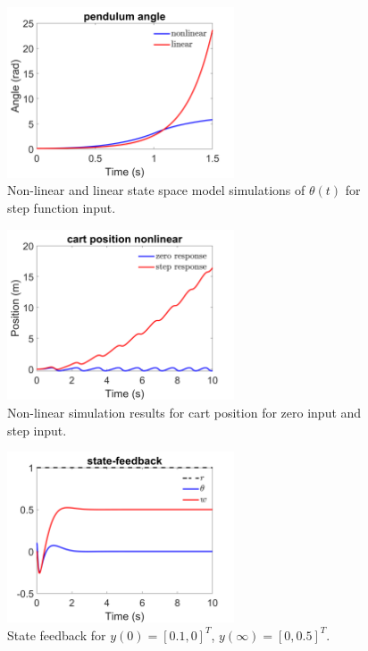 \documentclass[12pt]{article}
\numberwithin{equation}{section}
\begin{document}
\begin{figure}[!ht]
    \centering
    \includegraphics[width=0.6\textwidth]{theta_open_loop_step_input.png}
    \caption{Non-linear and linear state space model simulations of $\theta(t)$ for step function input.}
    \label{fig:4}
\end{figure}

\begin{figure}[!ht]
    \centering
    \includegraphics[width=0.6\textwidth]{nonlinear_zero_vs_step_w.png}
    \caption{Non-linear simulation results for cart position for zero input and step input.}
    \label{fig:5}
\end{figure}

\begin{figure}[!ht]
    \centering
    \includegraphics[width=0.6\textwidth]{state_feedback_1.png}
    \caption{State feedback for $y(0) = [0.1, 0]^T$, $y(\infty) = [0, 0.5]^T$.}
    \label{fig:6}
\end{figure}
\end{document}
